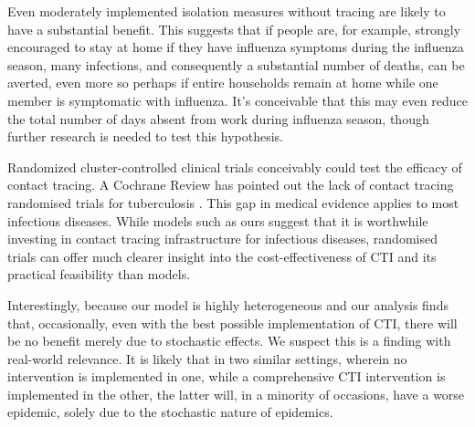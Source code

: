 \documentclass{article}
\begin{document}
Even moderately implemented isolation measures without tracing are likely to
have a substantial benefit. This suggests that if people are, for example,
strongly encouraged to stay at home if they have influenza symptoms during the
influenza season, many infections, and consequently a substantial number of
deaths, can be averted, even more so perhaps if entire households remain at home
while one member is symptomatic with influenza. It's conceivable that this may
even reduce the total number of days absent from work during influenza season,
though further research is needed to test this hypothesis.

Randomized cluster-controlled clinical trials conceivably could test the
efficacy of contact tracing. A Cochrane Review has pointed out the lack of
contact tracing randomised trials for tuberculosis \cite{Brangaza2019}. This gap
in medical evidence applies to most infectious diseases. While models such as
ours suggest that it is worthwhile investing in contact tracing infrastructure
for infectious diseases, randomised trials can offer much clearer insight into
the cost-effectiveness of CTI and its practical feasibility than models.

Interestingly, because our model is highly heterogeneous and our analysis finds
that, occasionally, even with the best possible implementation of CTI, there
will be no benefit merely due to stochastic effects. We suspect this is a
finding with real-world relevance. It is likely that in two similar settings,
wherein no intervention is implemented in one, while a comprehensive CTI
intervention is implemented in the other, the latter will, in a minority of
occasions, have a worse epidemic, solely due to the stochastic nature of
epidemics.
\end{document}
